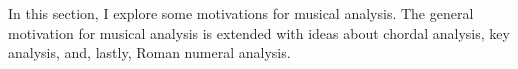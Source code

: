 

In this section, I explore some motivations for musical analysis. The general motivation for musical analysis is extended with ideas about chordal analysis, key analysis, and, lastly, Roman numeral analysis.
